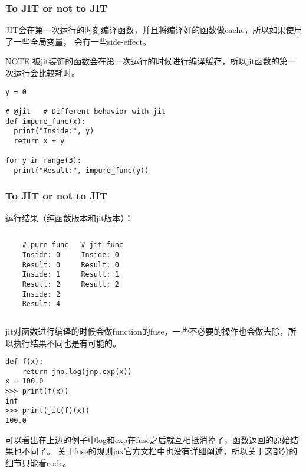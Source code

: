 \documentclass{beamer}
\begin{document}
\begin{frame}[fragile]
\frametitle{To JIT or not to JIT}

JIT会在第一次运行的时刻编译函数，并且将编译好的函数做cache，所以如果使用了一些全局变量，
会有一些side-effect。\newline

\begin{block}{NOTE}
被jit装饰的函数会在第一次运行的时候进行编译缓存，所以jit函数的第一次运行会比较耗时。
\end{block}

\begin{verbatim}
y = 0

# @jit   # Different behavior with jit
def impure_func(x):
  print("Inside:", y)
  return x + y

for y in range(3):
  print("Result:", impure_func(y))
\end{verbatim}
\end{frame}

\begin{frame}[fragile]
\frametitle{To JIT or not to JIT}

运行结果（纯函数版本和jit版本）：

\begin{columns}
\begin{verbatim}
    # pure func
    Inside: 0
    Result: 0
    Inside: 1
    Result: 2
    Inside: 2
    Result: 4
\end{verbatim}

\begin{verbatim}
# jit func
Inside: 0
Result: 0
Result: 1
Result: 2
\end{verbatim}

\end{columns}

\end{frame}

\begin{frame}[fragile]
jit对函数进行编译的时候会做function的fuse，一些不必要的操作也会做去除，所以执行结果不同也是有可能的。
\begin{verbatim}
def f(x):
    return jnp.log(jnp.exp(x))
x = 100.0
>>> print(f(x))
inf
>>> print(jit(f)(x))
100.0
\end{verbatim}
可以看出在上边的例子中log和exp在fuse之后就互相抵消掉了，函数返回的原始结果也不同了。\newline
关于fuse的规则jax官方文档中也没有详细阐述，所以关于这部分的细节只能看code。

\end{frame}
\end{document}
